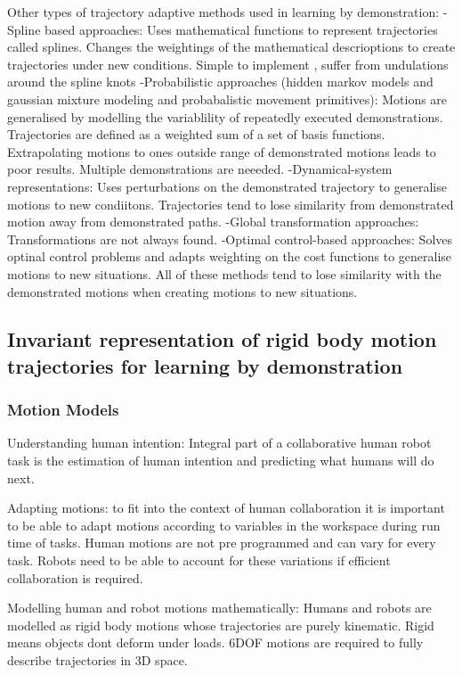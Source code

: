 \documentclass{article}
\begin{document}
Other types of trajectory adaptive methods used in learning by demonstration: 
-Spline based approaches: Uses mathematical functions to represent trajectories called splines. Changes the weightings of the mathematical descrioptions to create trajectories under new conditions. Simple to implement , suffer from undulations around the spline knots 
-Probabilistic approaches (hidden markov models and gaussian mixture modeling and probabalistic movement primitives): Motions are generalised by modelling the variablility of repeatedly executed demonstrations. Trajectories are defined as a weighted sum of a set of basis functions. Extrapolating motions to ones outside range of demonstrated motions leads to poor results. Multiple demonstrations are neeeded. 
-Dynamical-system representations: Uses perturbations on the demonstrated trajectory to generalise motions to new condiitons. Trajectories tend to lose similarity from demonstrated motion away from demonstrated paths. 
-Global transformation approaches: Transformations are not always found.
-Optimal control-based approaches: Solves optinal control problems and adapts weighting on the cost functions to generalise motions to new situations. 
All of these methods tend to lose similarity with the demonstrated motions when creating motions to new situations.

\subsection{Invariant representation of rigid body motion trajectories for learning by demonstration}
\subsubsection{Motion Models}
Understanding human intention: 
Integral part of a collaborative human robot task is the estimation of human intention and predicting what humans will do next. 

Adapting motions:
to fit into the context of human collaboration it is important to be able to adapt motions according to variables in the workspace during run time of tasks. 
Human motions are not pre programmed and can vary for every task.
Robots need to be able to account for these variations if efficient collaboration is required. 

Modelling human and robot motions mathematically: 
Humans and robots are modelled as rigid body motions whose trajectories are purely kinematic. 
Rigid means objects dont deform under loads.
6DOF motions are required to fully describe trajectories in 3D space.
\end{document}
